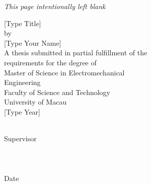 \RaggedRight
\thispagestyle{umempty}
\begin{center}
\vspace*{5\baselineskip}
\textit{ \Large This page intentionally left blank}
\end{center}

\begin{titlepage}
\begin{center}
{[Type Title]} \\ [1.5\baselineskip]
{by}\\[1.5\baselineskip]
{[Type Your Name]}\\[1.5\baselineskip]
{A thesis submitted in partial fulfillment of the\\requirements for the degree of } \\[1.5\baselineskip]
{Master of Science in Electromechanical\\Engineering}\\[1.5\baselineskip]
{Faculty of Science and Technology\\University of Macau}\\[1.5\baselineskip]
{[Type Year]} \\[5\baselineskip]
\end{center}
 \underline{\hspace*{11.5cm} } \\
\hphantom{\hspace{70mm}} {Supervisor} \\[\baselineskip]
\hphantom{Approved by} \underline{\hspace*{11.5cm} } \\[\baselineskip]
\hphantom{Approved by} \underline{\hspace*{11.5cm} }\\[\baselineskip]
\hphantom{Approved by} \underline{\hspace*{11.5cm} }\\[\baselineskip]
{Date} \underline{\hspace*{13cm} }\\
\vspace*{\fill}

\thispagestyle{umempty}
\begin{center}
\vspace*{5\baselineskip}
\textit{  }
\end{center}
\thispagestyle{umempty}


\end{titlepage}
